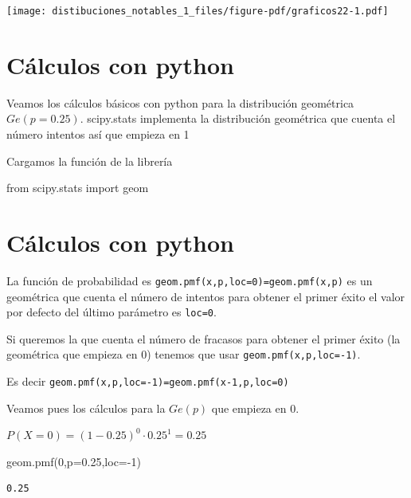 \documentclass[
  letterpaper,
  DIV=11,
  numbers=noendperiod]{scrreprt}
\newenvironment{Shaded}{\begin{snugshade}}{\end{snugshade}}
\newcommand{\DecValTok}[1]{\textcolor[rgb]{0.68,0.00,0.00}{#1}}
\newcommand{\FloatTok}[1]{\textcolor[rgb]{0.68,0.00,0.00}{#1}}
\newcommand{\ImportTok}[1]{\textcolor[rgb]{0.00,0.46,0.62}{#1}}
\newcommand{\NormalTok}[1]{\textcolor[rgb]{0.00,0.23,0.31}{#1}}
\newcommand{\OperatorTok}[1]{\textcolor[rgb]{0.37,0.37,0.37}{#1}}
\begin{document}
\begin{center}
\texttt{[image: distibuciones\_notables\_1\_files/figure-pdf/graficos22-1.pdf]}
\end{center}

\section{Cálculos con python}\label{cuxe1lculos-con-python}

Veamos los cálculos básicos con python para la distribución geométrica
\(Ge(p=0.25)\). scipy.stats implementa la distribución geométrica que
cuenta el número intentos así que empieza en 1

Cargamos la función de la librería

\begin{Shaded}
\begin{Highlighting}[]
\ImportTok{from}\NormalTok{ scipy.stats }\ImportTok{import}\NormalTok{ geom}
\end{Highlighting}
\end{Shaded}

\section{Cálculos con python}\label{cuxe1lculos-con-python-1}

La función de probabilidad es \texttt{geom.pmf(x,p,loc=0)=geom.pmf(x,p)}
es un geométrica que cuenta el número de intentos para obtener el primer
éxito el valor por defecto del último parámetro es \texttt{loc=0}.

Si queremos la que cuenta el número de fracasos para obtener el primer
éxito (la geométrica que empieza en 0) tenemos que usar
\texttt{geom.pmf(x,p,loc=-1)}.

Es decir \texttt{geom.pmf(x,p,loc=-1)=geom.pmf(x-1,p,loc=0)}

Veamos pues los cálculos para la \(Ge(p)\) que empieza en \(0\).

\(P(X=0)=(1-0.25)^0\cdot 0.25^1=0.25\)

\begin{Shaded}
\begin{Highlighting}[]
\NormalTok{geom.pmf(}\DecValTok{0}\NormalTok{,p}\OperatorTok{=}\FloatTok{0.25}\NormalTok{,loc}\OperatorTok{={-}}\DecValTok{1}\NormalTok{)}
\end{Highlighting}
\end{Shaded}

\begin{verbatim}
0.25
\end{verbatim}
\end{document}
